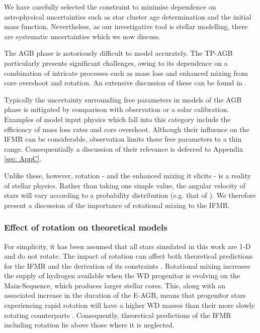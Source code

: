 We have carefully selected the constraint \cite{Andrews} to minimise dependence on astrophysical uncertainties such as star cluster age determination and the initial mass function. Nevertheless, as our investigative tool is stellar modelling, there are systematic uncertainties which we now discuss.


The AGB phase is notoriously difficult to model accurately. The TP-AGB particularly presents significant challenges, owing to its dependence on a combination of intricate processes such as mass loss and enhanced mixing from core overshoot and rotation. An extensive discussion of these can be found in \cite{kerschbaum2007galaxies}. 


Typically the uncertainty surrounding free parameters in models of the AGB phase is mitigated by comparison with observation or a solar calibration. Examples of model input physics which fall into this category include the efficiency of mass loss rates and core overshoot. Although their influence on the IFMR can be considerable, observation limits these free parameters to a thin range. Consequentially a discussion of their relevance is deferred to Appendix \ref{sec: AppC}.


Unlike these, however, rotation - and the enhanced mixing it elicits - is a reality of stellar physics. Rather than taking one simple value, the angular velocity of stars will vary according to a probability distribution (e.g. that of \cite{Huang2010}). We therefore present a discussion of the importance of rotational mixing to the IFMR. 


\subsubsection*{Effect of rotation on theoretical models}
For simplicity, it has been assumed that all stars simulated in this work are 1-D and do not rotate. The impact of rotation can affect both theoretical predictions for the IFMR and the derivation of its constraints \cite{Cummings_2019}. Rotational mixing increases the supply of hydrogen available when the WD progenitor is evolving on the Main-Sequence, which produces larger stellar cores. This, along with an associated increase in the duration of the E-AGB, means that progenitor stars experiencing rapid rotation will have a higher WD masses than their more slowly rotating counterparts \cite{Dominguez_1996}. Consequently, theoretical predictions of the IFMR including rotation lie above those where it is neglected.

